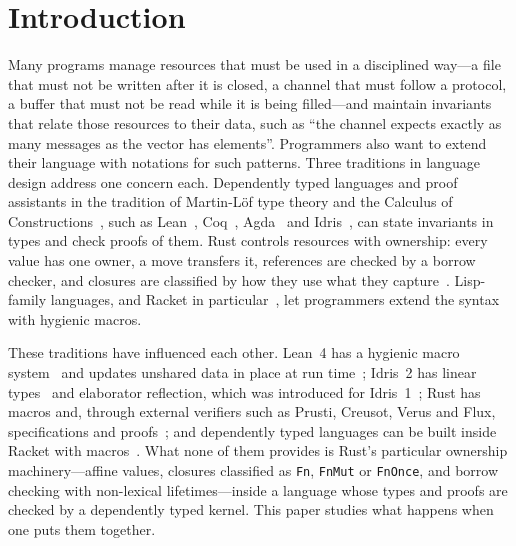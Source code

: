 \section{Introduction}\label{sec:intro}

Many programs manage resources that must be used in a disciplined way---a file that must not be written after it is closed, a channel that must follow a protocol, a buffer that must not be read while it is being filled---and maintain invariants that relate those resources to their data, such as ``the channel expects exactly as many messages as the vector has elements''.
Programmers also want to extend their language with notations for such patterns.
Three traditions in language design address one concern each.
Dependently typed languages and proof assistants in the tradition of Martin-L\"of type theory and the Calculus of Constructions~\cite{martinlof1984,coquand1988}, such as Lean~\cite{lean2015,lean42021}, Coq~\cite{bertot2004coqart}, Agda~\cite{norell2007} and Idris~\cite{brady2013,brady2021}, can state invariants in types and check proofs of them.
Rust controls resources with ownership: every value has one owner, a move transfers it, references are checked by a borrow checker, and closures are classified by how they use what they capture~\cite{jung2018rustbelt,rfc2094}.
Lisp-family languages, and Racket in particular~\cite{racket2018,flatt2016scopes}, let programmers extend the syntax with hygienic macros.

These traditions have influenced each other.
Lean~4 has a hygienic macro system~\cite{ullrich2022} and updates unshared data in place at run time~\cite{ullrich2019beans}; Idris~2 has linear types~\cite{brady2021} and elaborator reflection, which was introduced for Idris~1~\cite{christiansen2016elab}; Rust has macros and, through external verifiers such as Prusti, Creusot, Verus and Flux, specifications and proofs~\cite{astrauskas2019prusti,denis2022creusot,lattuada2023verus,lehmann2023flux}; and dependently typed languages can be built inside Racket with macros~\cite{chang2020dependent}.
What none of them provides is Rust's particular ownership machinery---affine values, closures classified as \lstinline|Fn|, \lstinline|FnMut| or \lstinline|FnOnce|, and borrow checking with non-lexical lifetimes---inside a language whose types and proofs are checked by a dependently typed kernel.
This paper studies what happens when one puts them together.

